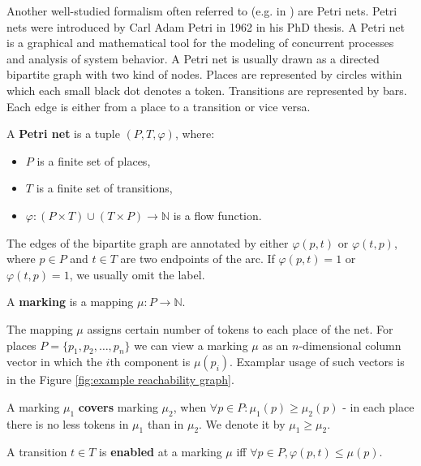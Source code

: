 Another well-studied formalism often referred to (e.g. in \cite{Dang04Sequential,Freund:2004:Async}) are Petri nets. Petri nets \cite{Petri62,Yen06PetriNets} were introduced by Carl Adam Petri in 1962 in his PhD thesis. A Petri net is a graphical and mathematical tool for the modeling of concurrent processes and analysis of system behavior. A Petri net is usually drawn as a directed bipartite graph with two kind of nodes. Places are represented by circles within which each small black dot denotes a token. Transitions are represented by bars. Each edge is either from a place to a transition or vice versa.

\begin{definition}
  A  {\bf Petri net} is a tuple $(P, T, \varphi)$, where:
  \begin{itemize}
    \item $P$ is a finite set of places,
    \item $T$ is a finite set of transitions,
    \item $\varphi: (P\times T)\cup(T\times P)\rightarrow \mathbb N$ is a flow function.
  \end{itemize}
\end{definition}

The edges of the bipartite graph are annotated by either $\varphi(p,t)$ or $\varphi(t,p)$, where $p\in P$ and $t\in T$ are two endpoints of the arc. If $\varphi(p,t)=1$ or $\varphi(t,p)=1$, we usually omit the label.

\begin{definition}
  A {\bf marking} is a mapping $\mu: P\rightarrow \mathbb N$.
\end{definition}

The mapping $\mu$ assigns certain number of tokens to each place of the net. For places $P=\{p_1, p_2, \dots, p_n\}$ we can view a marking $\mu$ as an $n$-dimensional column vector in which the $i$th component is $\mu(p_i)$. Examplar usage of such vectors is in the Figure \ref{fig:example reachability graph}.

\begin{definition}
  A marking $\mu_1$ {\bf covers} marking $\mu_2$, when $\forall p\in P: \mu_1(p)\geq\mu_2(p)$ - in each place there is no less tokens in $\mu_1$ than in $\mu_2$. We denote it by $\mu_1\geq\mu_2$.
\end{definition} 

\begin{definition}
  A transition $t\in T$ is {\bf enabled} at a marking $\mu$ iff $\forall p\in P, \varphi(p,t)\leq\mu(p)$.
\end{definition}


